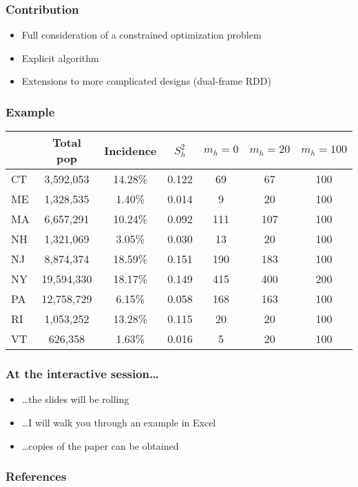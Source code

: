 \documentclass[final,hyperref={pdfpagelabels=false}]{beamer}
\begin{document}
\begin{frame}\frametitle{Contribution}

\begin{itemize}
    \item Full consideration of a constrained optimization problem
    \item Explicit algorithm
    \item Extensions to more complicated designs (dual-frame RDD)
\end{itemize}

\end{frame}

\begin{frame}\frametitle{Example}

\hspace{-0.5cm}
\begin{tabular}{l|c|cc|ccc}
                 & Total pop  & Incidence   & $S_h^2$   & $m_h=0$ & $m_h=20$ & $m_h=100$ \\
        \hline
            CT   & 3,592,053  & 14.28\%     & 0.122 & 69  &  67   & 100 \\
            ME   & 1,328,535  & 1.40\%      & 0.014 & 9   &  20   & 100 \\
            MA   & 6,657,291  & 10.24\%     & 0.092 & 111 &  107  & 100 \\
            NH   & 1,321,069  & 3.05\%      & 0.030 & 13  &  20   & 100 \\
            NJ   & 8,874,374  & 18.59\%     & 0.151 & 190 &  183  & 100 \\
            NY   & 19,594,330 & 18.17\%     & 0.149 & 415 &  400  & 200 \\
            PA   & 12,758,729 & 6.15\%      & 0.058 & 168 &  163  & 100 \\
            RI   & 1,053,252  & 13.28\%     & 0.115 & 20  &  20   & 100 \\
            VT   & 626,358    & 1.63\%      & 0.016 & 5   &  20   & 100 \\
\end{tabular}

\end{frame}

\begin{frame}\frametitle{At the interactive session\ldots}

\begin{itemize}
    \item \ldots the slides will be rolling
    \item \ldots I will walk you through an example in Excel
    \item \ldots copies of the paper can be obtained
\end{itemize}

\end{frame}

\begin{frame}\frametitle{References}


\end{frame}
\end{document}
